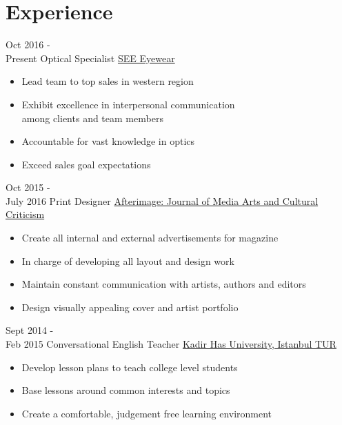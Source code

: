 \documentclass[letterpaper]{twentysecondcv} %
\begin{document}

\section{Experience}

\begin{twenty} %
	\twentyitem
    	{Oct 2016 - \\ Present}
        {Optical Specialist}
        {\href{https://www.seeeyewear.com/
}{SEE Eyewear}}
        {}
        {
        {\begin{itemize}
        \item Lead team to top sales in western region
        \item Exhibit excellence in interpersonal communication \\ among clients and team members 
        \item Accountable for vast knowledge in optics 
        \item Exceed sales goal expectations
    \end{itemize}}
        }
        
    \twentyitem
   		{Oct 2015 - \\ July 2016 }
        {Print Designer}
        {\href{http://vsw.org/afterimage/}{Afterimage: Journal of Media Arts and Cultural Criticism
        }}
        {}
        {
        {\begin{itemize}
        \item Create all internal and external advertisements for magazine 
        \item In charge of developing all layout and design work
        \item Maintain constant communication with artists, authors and editors
        \item Design visually appealing cover and artist portfolio
        
    \end{itemize}}
        }
        
     \twentyitem
   		{Sept 2014 - \\ Feb 2015}
        {Conversational English Teacher}
        {\href{http://www.khas.edu.tr/en/}{Kadir Has University, Istanbul TUR}}
        {}
        {
        \begin{itemize}
        \item Develop lesson plans to teach college level students
        \item Base lessons around common interests and topics
        \item Create a comfortable, judgement free learning environment

    \end{itemize}
    	}
        
\end{twenty}
\end{document}
